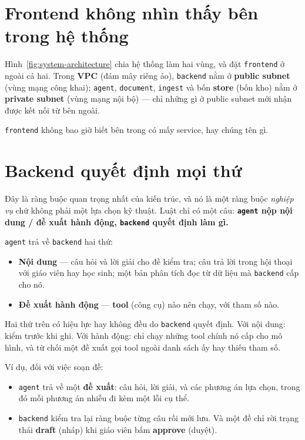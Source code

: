 \section{Frontend không nhìn thấy bên trong hệ thống}

Hình~\ref{fig:system-architecture} chia hệ thống làm hai vùng, và đặt \texttt{frontend} ở ngoài cả
hai. Trong \textbf{VPC} (đám mây riêng ảo), \texttt{backend} nằm ở \textbf{public subnet} (vùng
mạng công khai); \texttt{agent}, \texttt{document}, \texttt{ingest} và bốn \textbf{store} (bốn kho)
nằm ở \textbf{private subnet} (vùng mạng nội bộ) --- chỉ những gì ở public subnet mới nhận được kết
nối từ bên ngoài.

\texttt{frontend} không bao giờ biết bên trong có mấy service, hay chúng tên gì.

\section{Backend quyết định mọi thứ}

Đây là ràng buộc quan trọng nhất của kiến trúc, và nó là một ràng buộc \emph{nghiệp vụ} chứ không
phải một lựa chọn kỹ thuật. Luật chỉ có một câu: \textbf{\texttt{agent} nộp nội dung / đề xuất hành động,
\texttt{backend} quyết định làm gì.}

\texttt{agent} trả về \texttt{backend} hai thứ:

\begin{itemize}
  \item \textbf{Nội dung} --- câu hỏi và lời giải cho đề kiểm tra; câu trả lời trong hội thoại với giáo viên
        hay học sinh; một bản phân tích đọc từ dữ liệu mà \texttt{backend} cấp cho nó.
  \item \textbf{Đề xuất hành động} --- \textbf{tool} (công cụ) nào nên chạy, với tham số nào.
\end{itemize}

Hai thứ trên có hiệu lực hay không đều do \texttt{backend} quyết định. Với nội dung: kiểm trước khi ghi.
Với hành động: chỉ chạy những tool chính nó cấp cho mô hình, và từ chối một đề xuất gọi tool
ngoài danh sách ấy hay thiếu tham số.

Ví dụ, đối với việc soạn đề:

\begin{itemize}
  \item \texttt{agent} trả về một \textbf{đề xuất}: câu hỏi, lời giải, và các phương án lựa chọn, trong đó mỗi phương
        án nhiễu đi kèm một lỗi cụ thể.
  \item \texttt{backend} kiểm tra lại ràng buộc từng câu rồi mới lưu. Và một đề chỉ rời trạng
        thái \textbf{draft} (nháp) khi giáo viên bấm \textbf{approve} (duyệt).
\end{itemize}

